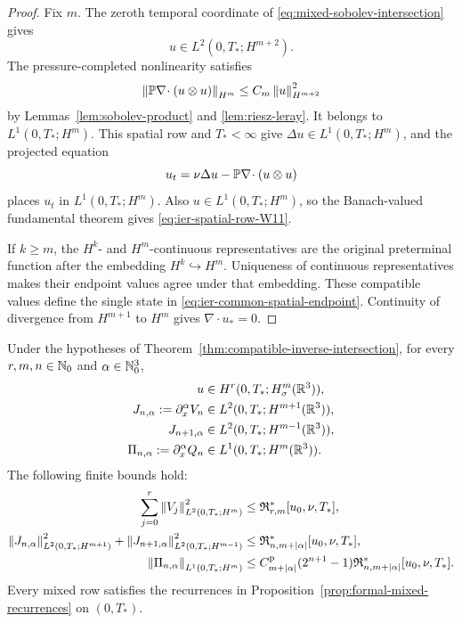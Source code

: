 \begin{proof}
Fix \(m\).  The zeroth temporal coordinate of
\eqref{eq:mixed-sobolev-intersection} gives
\[
 u\in L^2(0,T_*;H^{m+2}).
\]
The pressure-completed nonlinearity satisfies
\[
 \left\lVert \mathbb P\nabla\!\cdot(u\otimes u)\right\rVert_{H^m}
 \le C_m\left\lVert u\right\rVert_{H^{m+2}}^2
\]
by Lemmas~\ref{lem:sobolev-product} and \ref{lem:riesz-leray}.  It belongs
to \(L^1(0,T_*;H^m)\).  This spatial row and \(T_*<\infty\) give
\(\Delta u\in L^1(0,T_*;H^m)\), and the projected equation
\[
 u_t=\nu\Delta u-\mathbb P\nabla\!\cdot(u\otimes u)
\]
places \(u_t\) in \(L^1(0,T_*;H^m)\).  Also
\(u\in L^1(0,T_*;H^m)\), so the Banach-valued fundamental theorem gives
\eqref{eq:ier-spatial-row-W11}.

If \(k\ge m\), the \(H^k\)- and \(H^m\)-continuous representatives are
the original preterminal function after the embedding \(H^k\hookrightarrow
H^m\).  Uniqueness of continuous representatives makes their endpoint
values agree under that embedding.  These compatible values define the
single state in \eqref{eq:ier-common-spatial-endpoint}.  Continuity of
divergence from \(H^{m+1}\) to \(H^m\) gives \(\nabla\cdot u_*=0\).
\end{proof}

\begin{corollary}
\label{cor:ier-whole-terminal-mixed-jet}
Under the hypotheses of Theorem~\ref{thm:compatible-inverse-intersection},
for every \(r,m,n\in\mathbb N_0\) and \(\alpha\in\mathbb N_0^3\),
\begin{align}
 u&\in H^r(0,T_*;H^m_\sigma(\mathbb R^3)),
 \label{eq:ier-whole-terminal-bochner}\\
 J_{n,\alpha}:=\partial_x^\alpha V_n
 &\in L^2(0,T_*;H^{m+1}(\mathbb R^3)),
 \label{eq:ier-whole-terminal-mixed-upper}\\
 J_{n+1,\alpha}
 &\in L^2(0,T_*;H^{m-1}(\mathbb R^3)),
 \label{eq:ier-whole-terminal-mixed-lower}\\
 \Pi_{n,\alpha}:=\partial_x^\alpha Q_n
 &\in L^1(0,T_*;H^m(\mathbb R^3)).
 \label{eq:ier-whole-terminal-mixed-pressure}
\end{align}
The following finite bounds hold:
\begin{align}
 \sum_{j=0}^{r}\left\lVert V_j\right\rVert_{L^2(0,T_*;H^m)}^2
 &\le\mathfrak R_{r,m}^*[u_0,\nu,T_*],
 \label{eq:ier-finite-bochner-bound}\\
 \left\lVert J_{n,\alpha}\right\rVert_{L^2(0,T_*;H^{m+1})}^2
 +\left\lVert J_{n+1,\alpha}\right\rVert_{L^2(0,T_*;H^{m-1})}^2
 &\le\mathfrak R_{n,m+|\alpha|}^*[u_0,\nu,T_*],
 \label{eq:ier-finite-mixed-bound}\\
 \left\lVert \Pi_{n,\alpha}\right\rVert_{L^1(0,T_*;H^m)}
 &\le C_{m+|\alpha|}^{\rm p}(2^{n+1}-1)
 \mathfrak R_{n,m+|\alpha|}^*[u_0,\nu,T_*].
 \label{eq:ier-finite-mixed-pressure-bound}
\end{align}
Every mixed row satisfies the recurrences in
Proposition~\ref{prop:formal-mixed-recurrences} on \((0,T_*)\).
\end{corollary}

